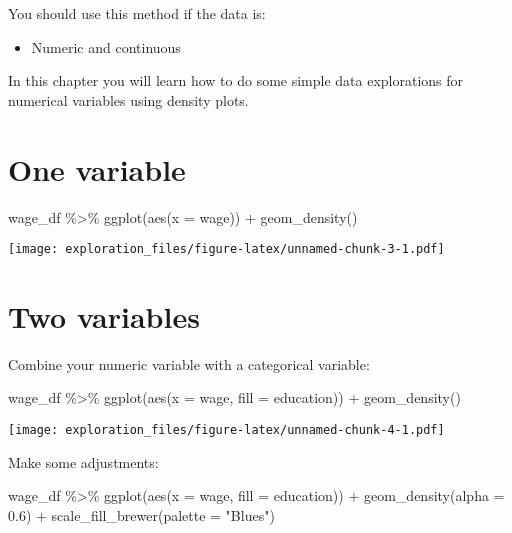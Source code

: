 \documentclass[
]{book}
\newenvironment{Shaded}{\begin{snugshade}}{\end{snugshade}}
\newcommand{\AttributeTok}[1]{\textcolor[rgb]{0.77,0.63,0.00}{#1}}
\newcommand{\FloatTok}[1]{\textcolor[rgb]{0.00,0.00,0.81}{#1}}
\newcommand{\FunctionTok}[1]{\textcolor[rgb]{0.00,0.00,0.00}{#1}}
\newcommand{\NormalTok}[1]{#1}
\newcommand{\SpecialCharTok}[1]{\textcolor[rgb]{0.00,0.00,0.00}{#1}}
\newcommand{\StringTok}[1]{\textcolor[rgb]{0.31,0.60,0.02}{#1}}
\providecommand{\tightlist}{%
  \setlength{\itemsep}{0pt}\setlength{\parskip}{0pt}}
\begin{document}
You should use this method if the data is:

\begin{itemize}
\tightlist
\item
  Numeric and continuous
\end{itemize}

In this chapter you will learn how to do some simple data explorations for numerical variables using density plots.

\hypertarget{one-variable-2}{%
\section{One variable}\label{one-variable-2}}

\begin{Shaded}
\begin{Highlighting}[]
\NormalTok{wage\_df }\SpecialCharTok{\%\textgreater{}\%} 
  \FunctionTok{ggplot}\NormalTok{(}\FunctionTok{aes}\NormalTok{(}\AttributeTok{x =}\NormalTok{ wage)) }\SpecialCharTok{+}
  \FunctionTok{geom\_density}\NormalTok{()}
\end{Highlighting}
\end{Shaded}

\texttt{[image: exploration\_files/figure-latex/unnamed-chunk-3-1.pdf]}

\hypertarget{two-variables-2}{%
\section{Two variables}\label{two-variables-2}}

Combine your numeric variable with a categorical variable:

\begin{Shaded}
\begin{Highlighting}[]
\NormalTok{wage\_df }\SpecialCharTok{\%\textgreater{}\%} 
  \FunctionTok{ggplot}\NormalTok{(}\FunctionTok{aes}\NormalTok{(}\AttributeTok{x =}\NormalTok{ wage, }\AttributeTok{fill =}\NormalTok{ education)) }\SpecialCharTok{+} 
  \FunctionTok{geom\_density}\NormalTok{() }
\end{Highlighting}
\end{Shaded}

\texttt{[image: exploration\_files/figure-latex/unnamed-chunk-4-1.pdf]}

Make some adjustments:

\begin{Shaded}
\begin{Highlighting}[]
\NormalTok{wage\_df }\SpecialCharTok{\%\textgreater{}\%} 
  \FunctionTok{ggplot}\NormalTok{(}\FunctionTok{aes}\NormalTok{(}\AttributeTok{x =}\NormalTok{ wage, }\AttributeTok{fill =}\NormalTok{ education)) }\SpecialCharTok{+}
  \FunctionTok{geom\_density}\NormalTok{(}\AttributeTok{alpha =} \FloatTok{0.6}\NormalTok{) }\SpecialCharTok{+}
  \FunctionTok{scale\_fill\_brewer}\NormalTok{(}\AttributeTok{palette =} \StringTok{"Blues"}\NormalTok{)}
\end{Highlighting}
\end{Shaded}
\end{document}
